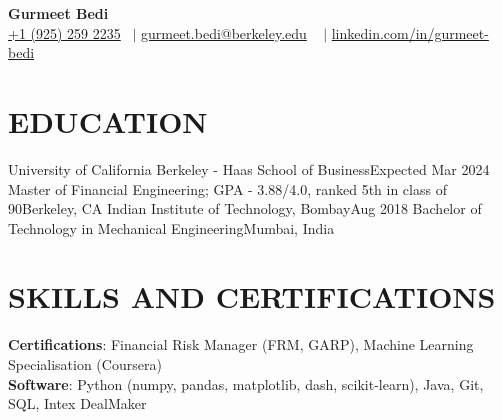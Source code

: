 

\begin{center}
    {\Huge  \textbf{Gurmeet Bedi}} \\ \vspace{1pt}
    \small  \href{tel:19252592235}{+1 (925) 259 2235}  ~$\mid$ \href{mailto:gurmeet.bedi@berkeley.edu}{ gurmeet.bedi@berkeley.edu} ~ $\mid$ \href{https://www.linkedin.com/in/gurmeet-bedi/}{ linkedin.com/in/gurmeet-bedi} 
    \\
    \vspace{1pt}
    \vspace{-8pt}
\end{center}


\section{EDUCATION}
  \resumeSubHeadingListStart
  \resumeSubheading
      {University of California Berkeley - Haas School of Business}{Expected Mar 2024}
      {Master of Financial Engineering; GPA - 3.88/4.0, ranked 5th in class of 90}{Berkeley, CA}{}
    \resumeSubheading
      {Indian Institute of Technology, Bombay}{Aug 2018}
      {Bachelor of Technology in Mechanical Engineering}{Mumbai, India}{}
    \resumeItemListStart
    \resumeItemListEnd
  \resumeSubHeadingListEnd


\section{SKILLS AND CERTIFICATIONS}
 \begin{itemize}[leftmargin=0.00in, label={}]
    \small{\item{
    \textbf{Certifications}{: Financial Risk Manager (FRM, GARP), Machine Learning Specialisation (Coursera)} \\
     \textbf{Software}{: 
     Python (numpy, pandas, matplotlib, dash, scikit-learn), 
     Java, 
     Git, 
     SQL, 
     Intex DealMaker
     }}}
 \end{itemize}
 \vspace{-16pt}


